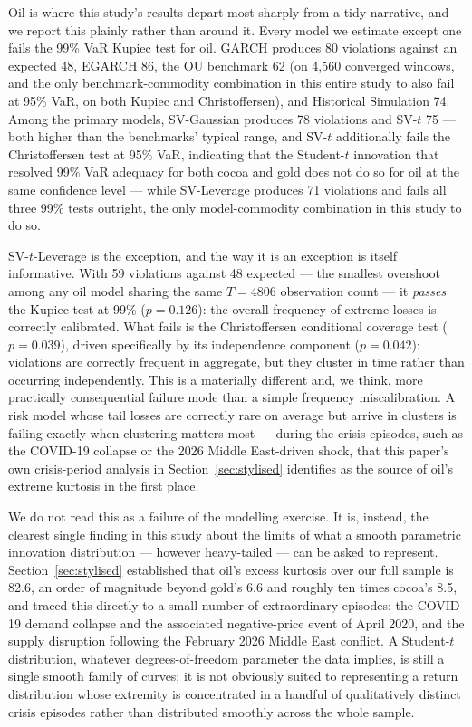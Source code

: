 \documentclass[preprint,12pt,authoryear]{elsarticle}
\begin{document}
Oil is where this study's results depart most sharply from a tidy narrative, and we report this plainly rather than around it. Every model we estimate except one fails the 99\% VaR Kupiec test for oil. GARCH produces 80 violations against an expected 48, EGARCH 86, the OU benchmark 62 (on 4,560 converged windows, and the only benchmark-commodity combination in this entire study to also fail at 95\% VaR, on both Kupiec and Christoffersen), and Historical Simulation 74. Among the primary models, SV-Gaussian produces 78 violations and SV-$t$ 75 --- both higher than the benchmarks' typical range, and SV-$t$ additionally fails the Christoffersen test at 95\% VaR, indicating that the Student-$t$ innovation that resolved 99\% VaR adequacy for both cocoa and gold does not do so for oil at the same confidence level --- while SV-Leverage produces 71 violations and fails all three 99\% tests outright, the only model-commodity combination in this study to do so.

SV-$t$-Leverage is the exception, and the way it is an exception is itself informative. With 59 violations against 48 expected --- the smallest overshoot among any oil model sharing the same $T=4806$ observation count --- it \emph{passes} the Kupiec test at 99\% ($p=0.126$): the overall frequency of extreme losses is correctly calibrated. What fails is the Christoffersen conditional coverage test ($p=0.039$), driven specifically by its independence component ($p=0.042$): violations are correctly frequent in aggregate, but they cluster in time rather than occurring independently. This is a materially different and, we think, more practically consequential failure mode than a simple frequency miscalibration. A risk model whose tail losses are correctly rare on average but arrive in clusters is failing exactly when clustering matters most --- during the crisis episodes, such as the COVID-19 collapse or the 2026 Middle East-driven shock, that this paper's own crisis-period analysis in Section~\ref{sec:stylised} identifies as the source of oil's extreme kurtosis in the first place.

We do not read this as a failure of the modelling exercise. It is, instead, the clearest single finding in this study about the limits of what a smooth parametric innovation distribution --- however heavy-tailed --- can be asked to represent. Section~\ref{sec:stylised} established that oil's excess kurtosis over our full sample is 82.6, an order of magnitude beyond gold's 6.6 and roughly ten times cocoa's 8.5, and traced this directly to a small number of extraordinary episodes: the COVID-19 demand collapse and the associated negative-price event of April 2020, and the supply disruption following the February 2026 Middle East conflict. A Student-$t$ distribution, whatever degrees-of-freedom parameter the data implies, is still a single smooth family of curves; it is not obviously suited to representing a return distribution whose extremity is concentrated in a handful of qualitatively distinct crisis episodes rather than distributed smoothly across the whole sample.
\end{document}
